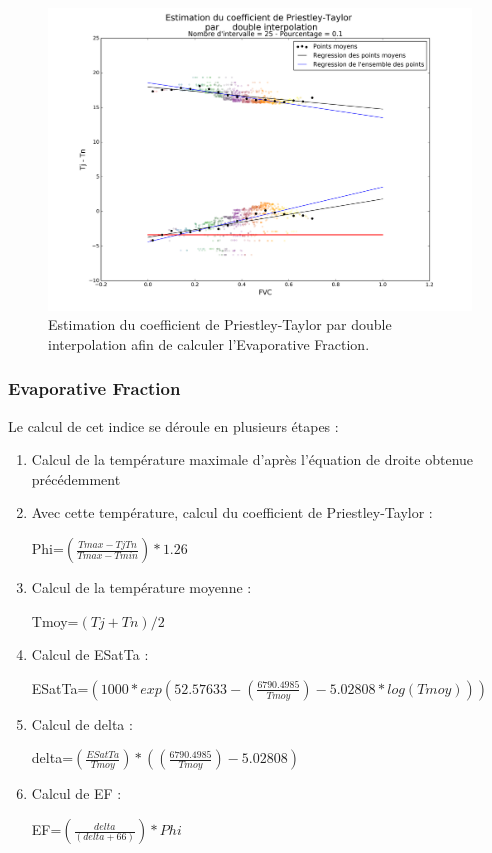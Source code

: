 \documentclass[10pt,a4paper]{article}
\begin{document}
\begin{figure}[!h]
\centering
\includegraphics[scale=0.35]{img/graph_priestley.png}
\caption{Estimation du coefficient de Priestley-Taylor par double interpolation afin de calculer l'Evaporative Fraction.}
\label{graphPriestley}
\end{figure}

\subsubsection{Evaporative Fraction}

Le calcul de cet indice se déroule en plusieurs étapes :
\begin{enumerate}
\item Calcul de la température maximale d'après l'équation de droite obtenue précédemment
\item Avec cette température, calcul du coefficient de Priestley-Taylor :
\begin{center}
\textrm{Phi}=$ (\frac{Tmax-TjTn}{Tmax-Tmin})*1.26 $
\end{center}\smallbreak
\item Calcul de la température moyenne :
\begin{center}
\textrm{Tmoy}=$ ({Tj+Tn})/2 $
\end{center}\smallbreak
\item Calcul de ESatTa :
\begin{center}
\textrm{ESatTa}=$ (1000*exp(52.57633-(\frac{6790.4985}{Tmoy})-5.02808*log(Tmoy))) $
\end{center}\smallbreak
\item Calcul de delta :
\begin{center}
\textrm{delta}=$ (\frac{ESatTa}{Tmoy}) * ((\frac{6790.4985}{Tmoy})-5.02808) $
\end{center}\smallbreak
\item Calcul de EF :
\begin{center}
\textrm{EF}=$ (\frac{delta}{(delta+66)})*Phi $
\end{center}\smallbreak
\end{enumerate}
\end{document}
